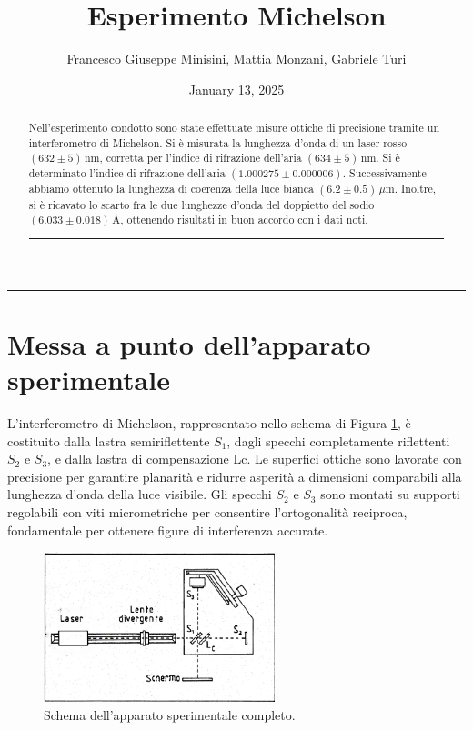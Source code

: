 \documentclass[a4paper,12pt]{article}
\title{Esperimento Michelson}
\author{Francesco Giuseppe Minisini, Mattia Monzani, Gabriele Turi}
\date{January 13, 2025}
\begin{document}
\maketitle
\hrule
\vspace{9pt}
\begin{abstract}
    \noindent
    Nell'esperimento condotto sono state effettuate misure ottiche di precisione tramite un interferometro di Michelson. Si è misurata la lunghezza d’onda di un laser rosso \((632 \pm 5)\,\text{nm}\), corretta per l’indice di rifrazione dell’aria \((634 \pm 5)\,\text{nm}\). Si è determinato l’indice di rifrazione dell’aria \((1.000275 \pm 0.000006)\). Successivamente abbiamo ottenuto la lunghezza di coerenza della luce bianca \((6.2 \pm 0.5)\,\mu\text{m}\). Inoltre, si è ricavato lo scarto fra le due lunghezze d’onda del doppietto del sodio \((6.033 \pm 0.018)\,\text{\AA}\), ottenendo risultati in buon accordo con i dati noti.
\vspace{20 pt}
\hrule
\end{abstract}
\vspace{2 pt}


\section{Messa a punto dell'apparato sperimentale}
L’interferometro di Michelson, rappresentato nello schema di Figura \ref{fig:apparato_completo}, è costituito dalla lastra semiriflettente \(S_1\), dagli specchi completamente riflettenti \(S_2\) e \(S_3\), e dalla lastra di compensazione Lc. Le superfici ottiche sono lavorate con precisione per garantire planarità e ridurre asperità a dimensioni comparabili alla lunghezza d’onda della luce visibile. Gli specchi \(S_2\) e \(S_3\) sono montati su supporti regolabili con viti micrometriche per consentire l’ortogonalità reciproca, fondamentale per ottenere figure di interferenza accurate.

\begin{figure}[H]
    \centering
    \includegraphics[width=0.6\textwidth]{Apparato2.png}
    \caption{Schema dell'apparato sperimentale completo.}
    \label{fig:apparato_completo}
\end{figure}
\end{document}
